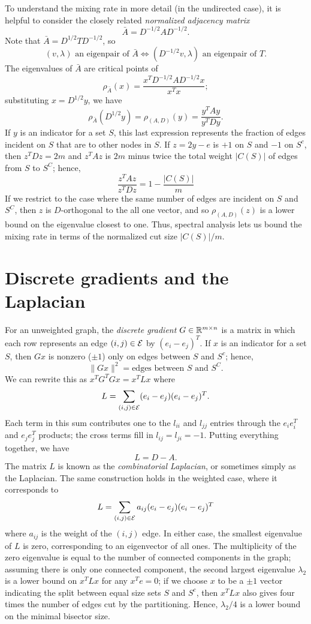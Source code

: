 \documentclass[12pt, leqno]{article} %
\begin{document}
To understand the mixing rate in more detail (in the undirected case),
it is helpful to consider the closely related
{\em normalized  adjacency matrix}
\[
  \bar{A} = D^{-1/2} A D^{-1/2}.
\]
Note that $\bar{A} = D^{1/2} T D^{-1/2}$, so
\[
  (v, \lambda) \mbox{ an eigenpair of } \bar{A} \iff
  (D^{-1/2} v, \lambda) \mbox{ an eigenpair of } T.
\]
The eigenvalues of $\bar{A}$ are critical points of
\[
  \rho_{\bar{A}}(x) = \frac{x^T D^{-1/2} A D^{-1/2} x}{x^T x};
\]
substituting $x = D^{1/2} y$, we have
\[
  \rho_{\bar{A}}(D^{1/2} y) = \rho_{(A,D)}(y) = \frac{y^T A y}{y^T D y}.
\]
If $y$ is an indicator for a set $S$, this last expression represents
the fraction of edges incident on $S$ that are to other nodes in $S$.
If $z = 2y-e$ is $+1$ on $S$ and $-1$ on $S^c$, then $z^T D z = 2m$
and $z^T A z$ is $2m$ minus twice the total weight $|C(S)|$ of
edges from $S$ to $S^C$; hence,
\[
  \frac{z^T A z}{z^T D z} = 1-\frac{|C(S)|}{m}
\]
If we restrict to the case where the same number of edges
are incident on $S$ and $S^C$, then $z$ is $D$-orthogonal
to the all one vector, and so $\rho_{(A,D)}(z)$ is a lower
bound on the eigenvalue closest to one.  Thus, spectral analysis
lets us bound the mixing rate in terms of the normalized cut
size $|C(S)|/m$.

\section{Discrete gradients and the Laplacian}

For an unweighted graph, the {\em discrete gradient}
$G \in \mathbb{R}^{m  \times n}$ is a matrix in which each row represents an edge
$(i,j) \in \mathcal{E}$ by $(e_i-e_j)^T$.  If $x$ is an indicator for a set $S$,
then $Gx$ is nonzero ($\pm 1$) only on edges between $S$ and $S^c$;
hence,
\[
  \|Gx\|^2 = \mbox{edges between } S \mbox{ and } S^C.
\]
We can rewrite this as $x^T G^T G x = x^T L x$ where
\[
  L = \sum_{(i,j) \in \mathcal{E}} (e_i-e_j) (e_i-e_j)^T.
\]
Each term in this sum contributes one to the $l_{ii}$ and $l_{jj}$
entries through the $e_i e_i^T$ and $e_j e_j^T$ products; the cross
terms fill in $l_{ij} = l_{ji} = -1$.  Putting everything together,
we have
\[
  L = D-A.
\]
The matrix $L$ is known as the {\em combinatorial Laplacian},
or sometimes simply as the Laplacian.  The same construction holds
in the weighted case, where it corresponds to
\[
  L = \sum_{(i,j) \in \mathcal{E}} a_{ij} (e_i-e_j) (e_i-e_j)^T
\]
where $a_{ij}$ is the weight of the $(i,j)$ edge.  In either case,
the smallest eigenvalue of $L$ is zero, corresponding to an
eigenvector of all ones.  The multiplicity of the zero eigenvalue
is equal to the number of connected components in the graph;
assuming there is only one connected component, the second largest
eigenvalue $\lambda_2$ is a lower bound on $x^T L x$ for any $x^T e = 0$;
if we choose $x$ to be a $\pm 1$ vector indicating the split between
equal size sets $S$ and $S^c$, then $x^T L x$ also gives four times
the number of edges cut by the partitioning.  Hence, $\lambda_2/4$
is a lower bound on the minimal bisector size.
\end{document}
